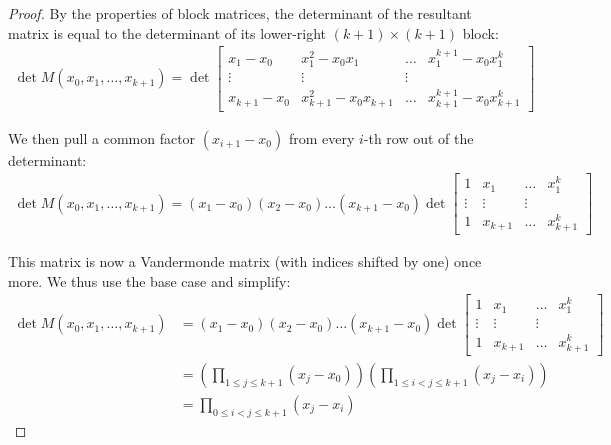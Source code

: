 \documentclass[a4paper]{scrreprt}
\begin{document}
\begin{proof}
By the properties of block matrices, the determinant of the resultant matrix is
equal to the determinant of its lower-right $(k+1) \times (k+1)$ block:
\begin{align*}
		\det M(x_0, x_1, \ldots, x_{k+1}) = \det \begin{bmatrix}
				x_1 - x_0 & x_1^2 - x_0 x_1 & \ldots & x_1^{k+1} - x_0 x_1^{k} \\
				\vdots & \vdots & \vdots \\
				x_{k+1} - x_0  & x_{k+1}^2 - x_0 x_{k+1} & \ldots & x_{k+1}^{k+1} - x_0 x_{k+1}^{k}
		\end{bmatrix}
\end{align*}

We then pull a common factor $(x_{i+1} - x_0)$ from every $i$-th row out of the
determinant:
\begin{align*}
		\det M(x_0, x_1, \ldots, x_{k+1}) = (x_1 - x_0) (x_2 - x_0) \ldots (x_{k+1} - x_0) 
		\det \begin{bmatrix}
				1 & x_1 & \ldots & x_1^{k} \\
				\vdots & \vdots & \vdots \\
				1 & x_{k+1} & \ldots & x_{k+1}^{k}
		\end{bmatrix}
\end{align*}

This matrix is now a Vandermonde matrix (with indices shifted by one)
once more. We thus use the base case and simplify:
\begin{align*}
\det M(x_0, x_1, \ldots, x_{k+1}) & = (x_1 - x_0) (x_2 - x_0) \ldots (x_{k+1} - x_0)
		                              \det \begin{bmatrix}
		                              		1 & x_1 & \ldots & x_1^{k} \\
		                              		\vdots & \vdots & \vdots \\
		                              		1 & x_{k+1} & \ldots & x_{k+1}^{k}
		                              \end{bmatrix} \\
								  & = \left(\prod_{1 \leq j \leq k+1} (x_j - x_0)\right) 
								      \left(\prod_{1 \leq i < j \leq {k+1}} (x_j - x_i)\right) \\
								  & = \prod_{0 \leq i < j \leq k+1} (x_j - x_i)
\end{align*}

\end{proof}
\end{document}

